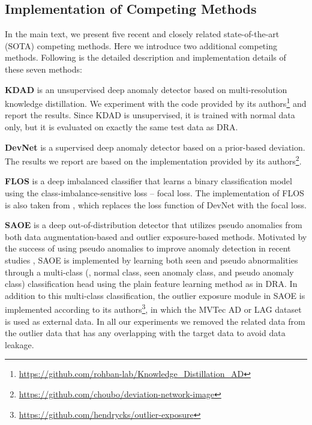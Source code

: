 \documentclass[10pt,twocolumn,letterpaper]{article}
\begin{document}
\subsection{Implementation of Competing Methods}
In the main text, we present five recent and closely related state-of-the-art (SOTA) competing methods. Here we introduce two additional competing methods. Following is the detailed description and implementation details of these seven methods:

\noindent\textbf{KDAD} \cite{salehi2021multiresolution} is an unsupervised deep anomaly detector based on multi-resolution knowledge distillation. We experiment with the code provided by its authors\footnote{\url{https://github.com/rohban-lab/Knowledge\_Distillation\_AD}} and report the results. Since KDAD is unsupervised, it is trained with normal data only, but it is evaluated on exactly the same test data as DRA.


\noindent\textbf{DevNet} \cite{pang2019deep,pang2021explainable} is a supervised deep anomaly detector based on a prior-based deviation. The results we report are based on the implementation provided by its authors\footnote{\url{https://github.com/choubo/deviation-network-image}}.


\noindent\textbf{FLOS} \cite{lin2017focalloss} is a deep imbalanced classifier that learns a binary classification model using the class-imbalance-sensitive loss -- focal loss. The implementation of FLOS is also taken from \cite{pang2021explainable}, which replaces the loss function of DevNet with the focal loss.


\noindent\textbf{SAOE} is a deep out-of-distribution detector that utilizes pseudo anomalies from both data augmentation-based and outlier exposure-based methods. Motivated by the success of using pseudo anomalies to improve anomaly detection in recent studies \cite{tack2020csi,li2021cutpaste}, SAOE is implemented by learning both seen and pseudo abnormalities through a multi-class (\ie, normal class, seen anomaly class, and pseudo anomaly class) classification head using the plain feature learning method as in DRA. In addition to this multi-class classification, the outlier exposure module \cite{hendrycks2018deep} in SAOE is implemented according to its authors\footnote{\url{https://github.com/hendrycks/outlier-exposure}}, in which the MVTec AD \cite{Bergmann_2019_CVPR} or LAG \cite{Li_2019_CVPR} dataset is used as external data. In all our experiments we removed the related data from the outlier data that has any overlapping with the target data to avoid data leakage.
\end{document}

